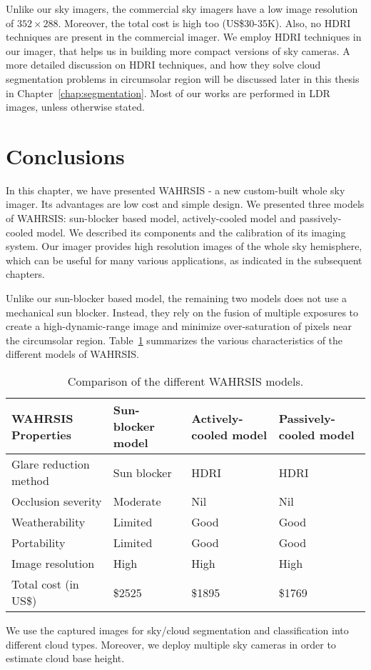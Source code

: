 Unlike our sky imagers, the commercial sky imagers have a low image resolution of $352\times288$. Moreover, the total cost is high too (US\$30-35K). Also, no HDRI techniques are present in the commercial imager. We employ HDRI techniques in our imager, that helps us in building more compact versions of sky cameras.
A more detailed discussion on HDRI techniques, and how they solve cloud segmentation problems in circumsolar region will be discussed later in this thesis in Chapter~\ref{chap:segmentation}. Most of our works are performed in LDR images, unless otherwise stated.


\section{Conclusions} 
\label{sec:WSI-conclude}
In this chapter, we have presented WAHRSIS - a new custom-built whole sky imager. Its advantages are low cost and simple design. We presented three models of WAHRSIS: sun-blocker based model, actively-cooled model and passively-cooled model. We described its components and the calibration of its imaging system. Our imager provides high resolution images of the whole sky hemisphere, which can be useful for many various applications, as indicated in the subsequent chapters.

Unlike our sun-blocker based model, the remaining two models does not use a mechanical sun blocker. Instead, they rely on the fusion of multiple exposures to create a high-dynamic-range image and minimize over-saturation of pixels near the circumsolar region. Table~\ref{tab:diff-WAHRSIS} summarizes the various characteristics of the different models of WAHRSIS.

\begin{table}[htb]
\small
\centering
\begin{tabular}{ |l|p{3cm}|p{3cm}|p{3cm}| }
\hline 
WAHRSIS Properties  & \textbf{Sun-blocker model} &  \textbf{Actively-cooled model} & \textbf{Passively-cooled model} \\
\hline \hline
Glare reduction method & Sun blocker & HDRI & HDRI  \\ \hline
Occlusion severity & Moderate & Nil & Nil \\ \hline 
Weatherability  & Limited & Good & Good \\ \hline
Portability  & Limited & Good  & Good \\ \hline
Image resolution  & High & High  & High \\ \hline 
Total cost (in US\$)& \$2525  & \$1895 & \$1769  \\ \hline
\end{tabular}
\caption{Comparison of the different WAHRSIS models.}
\label{tab:diff-WAHRSIS}
\end{table}

We use the captured images for sky/cloud segmentation and classification into different cloud types. Moreover, we deploy multiple sky cameras in order to estimate cloud base height. 

 

